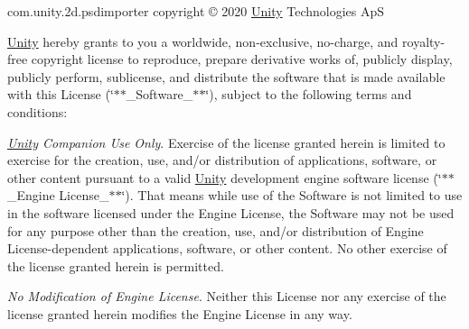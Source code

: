 com.\+unity.\+2d.\+psdimporter copyright © 2020 \mbox{\hyperlink{namespace_unity}{Unity}} Technologies ApS

\mbox{\hyperlink{namespace_unity}{Unity}} hereby grants to you a worldwide, non-\/exclusive, no-\/charge, and royalty-\/free copyright license to reproduce, prepare derivative works of, publicly display, publicly perform, sublicense, and distribute the software that is made available with this License (\char`\"{}$\ast$$\ast$\+\_\+\+Software\+\_\+$\ast$$\ast$\char`\"{}), subject to the following terms and conditions\+:


\begin{DoxyEnumerate}
\item {\itshape \mbox{\hyperlink{namespace_unity}{Unity}} Companion Use Only}. Exercise of the license granted herein is limited to exercise for the creation, use, and/or distribution of applications, software, or other content pursuant to a valid \mbox{\hyperlink{namespace_unity}{Unity}} development engine software license (\char`\"{}$\ast$$\ast$\+\_\+\+Engine License\+\_\+$\ast$$\ast$\char`\"{}). That means while use of the Software is not limited to use in the software licensed under the Engine License, the Software may not be used for any purpose other than the creation, use, and/or distribution of Engine License-\/dependent applications, software, or other content. No other exercise of the license granted herein is permitted.
\end{DoxyEnumerate}
\begin{DoxyEnumerate}
\item {\itshape No Modification of Engine License}. Neither this License nor any exercise of the license granted herein modifies the Engine License in any way.
\end{DoxyEnumerate}
